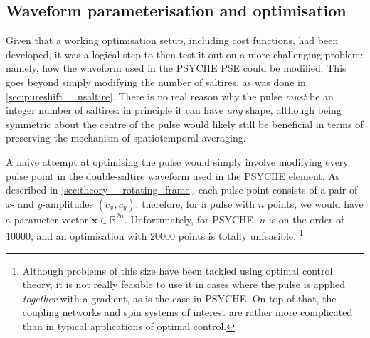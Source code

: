 \subsection{Waveform parameterisation and optimisation}
\label{subsec:pureshift__chirpopt}

Given that a working optimisation setup, including cost functions, had been developed, it was a logical step to then test it out on a more challenging problem: namely, how the waveform used in the PSYCHE PSE could be modified.
This goes beyond simply modifying the number of saltires, as was done in \cref{sec:pureshift__nsaltire}.
There is no real reason why the pulse \textit{must} be an integer number of saltires: in principle it can have \textit{any} shape, although being symmetric about the centre of the pulse would likely still be beneficial in terms of preserving the mechanism of spatiotemporal averaging.

A naive attempt at optimising the pulse would simply involve modifying every pulse point in the double-saltire waveform used in the PSYCHE element.
As described in \cref{sec:theory__rotating_frame}, each pulse point consists of a pair of $x$- and $y$-amplitudes $(c_x, c_y)$; therefore, for a pulse with $n$ points, we would have a parameter vector $\symbf{x} \in \mathbb{R}^{2n}$.
Unfortunately, for PSYCHE, $n$ is on the order of $10000$, and an optimisation with $20000$ points is totally unfeasible.%
\footnote{Although problems of this size have been tackled using optimal control theory\autocite{Khaneja2005JMR,deFouquieres2011JMR,Glaser2015EPJD,Goodwin2016JCP}, it is not really feasible to use it in cases where the pulse is applied \textit{together} with a gradient, as is the case in PSYCHE. On top of that, the coupling networks and spin systems of interest are rather more complicated than in typical applications of optimal control.}

